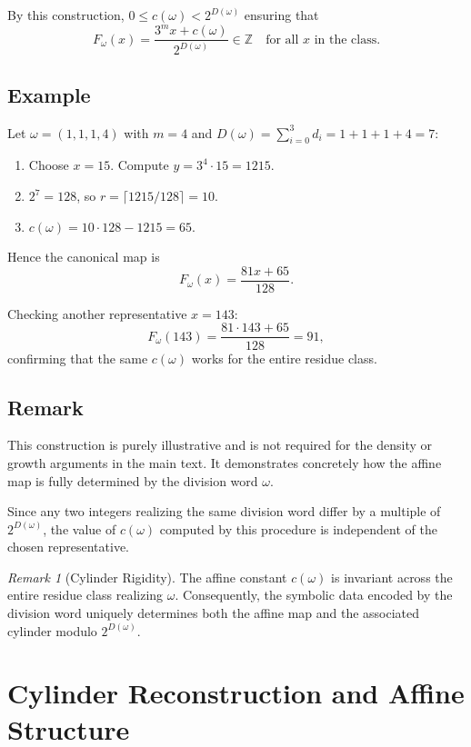 \documentclass[12pt, oneside]{article}
\numberwithin{equation}{section}
\theoremstyle{definition}
\theoremstyle{plain}
\theoremstyle{remark}
\newtheorem*{remark}{Remark}
\begin{document}
By this construction, \(0 \le c(\omega) < 2^{D(\omega)}\) ensuring that
\[
F_\omega(x) = \frac{3^m x + c(\omega)}{2^{D(\omega)}} \in \mathbb{Z} \quad \text{for all } x \text{ in the class.}
\]

\newpage
\subsection{Example}

Let \(\omega = (1,1,1,4)\) with \(m=4\) and \(D(\omega) = \sum_{i=0}^{3} d_i = 1 + 1 + 1 + 4 = 7\):

\begin{enumerate}
\item Choose \(x = 15\). Compute \(y = 3^4 \cdot 15 = 1215\).  
\item \(2^7 = 128\), so \(r = \lceil 1215/128 \rceil = 10\).  
\item \(c(\omega) = 10 \cdot 128 - 1215 = 65\).  
\end{enumerate}

Hence the canonical map is
\[
F_\omega(x) = \frac{81x + 65}{128}.
\]

Checking another representative \(x = 143\):
\[
F_\omega(143) = \frac{81 \cdot 143 + 65}{128} = 91,
\]
confirming that the same \(c(\omega)\) works for the entire residue class.

\subsection*{Remark}

This construction is purely illustrative and is not required for the density
or growth arguments in the main text. It demonstrates concretely how the affine
map is fully determined by the division word \(\omega\).

Since any two integers realizing the same division word differ by a multiple of $2^{D(\omega)}$,
the value of $c(\omega)$ computed by this procedure is independent of the chosen
representative.

\begin{remark}[Cylinder Rigidity]
The affine constant \(c(\omega)\) is invariant across the entire residue
class realizing \(\omega\).  Consequently, the symbolic data encoded by
the division word uniquely determines both the affine map and the associated
cylinder modulo \(2^{D(\omega)}\).
\end{remark}


\newpage
\section{Cylinder Reconstruction and Affine Structure}
\label{app:cylinder-reconstruction}
\end{document}
